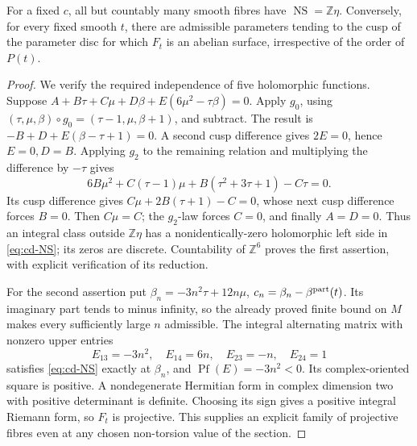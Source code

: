 \begin{proposition}[D.1.5; Proved]\label{st:D.1.5}
For a fixed \(c\), all but countably many smooth fibres have
\(\operatorname{NS}=\mathbb Z\eta\). Conversely, for every fixed smooth
\(t\), there are admissible parameters tending to the cusp of the
parameter disc for which \(F_t\) is an abelian surface, irrespective of
the order of \(P(t)\).
\end{proposition}
\begin{proof}
We verify the required independence of five holomorphic functions.
Suppose \(A+B\tau+C\mu+D\beta+E(6\mu^2-\tau\beta)=0\).
Apply \(g_0\), using \((\tau,\mu,\beta)\circ g_0=(\tau-1,\mu,\beta+1)\),
and subtract. The result is \(-B+D+E(\beta-\tau+1)=0\).
A second cusp difference gives \(2E=0\), hence \(E=0,D=B\).
Applying \(g_2\) to the remaining relation and multiplying the difference
by \(-\tau\) gives
\[
 6B\mu^2+C(\tau-1)\mu+B(\tau^2+3\tau+1)-C\tau=0.
\]
Its cusp difference gives \(C\mu+2B(\tau+1)-C=0\), whose next cusp
difference forces \(B=0\). Then \(C\mu=C\); the \(g_2\)-law forces
\(C=0\), and finally \(A=D=0\). Thus an integral class outside
\(\mathbb Z\eta\) has a nonidentically-zero holomorphic left side in
\eqref{eq:cd-NS}; its zeros are discrete. Countability of \(\mathbb Z^6\)
proves the first assertion, with explicit verification of its reduction.

For the second assertion put
\(\beta_n=-3n^2\tau+12n\mu\),
\(c_n=\beta_n-\beta^{\rm part}(t)\). Its imaginary part tends to
minus infinity, so the already proved finite bound on \(M\) makes every
sufficiently large \(n\) admissible. The integral alternating matrix
with nonzero upper entries
\[
 E_{13}=-3n^2,\quad E_{14}=6n,\quad E_{23}=-n,\quad E_{24}=1
\]
satisfies \eqref{eq:cd-NS} exactly at \(\beta_n\), and
\(\operatorname{Pf}(E)=-3n^2<0\). Its complex-oriented square is positive.
A nondegenerate Hermitian form in complex dimension two with positive
determinant is definite. Choosing its sign gives a positive integral
Riemann form, so \(F_t\) is projective. This supplies an explicit family
of projective fibres even at any chosen non-torsion value of the section.
\end{proof}

